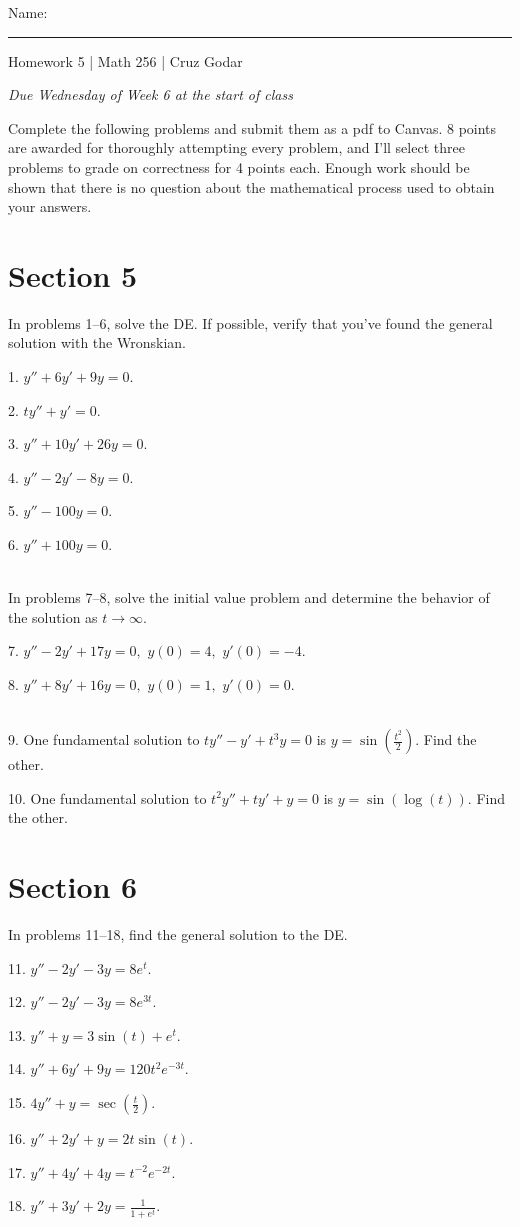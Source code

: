 \documentclass{article}
\begin{document}
\Large Name: \rule{2in}{0.15mm} \hfill Homework 5 | Math 256 | Cruz Godar \vspace{4pt}  \normalsize

\textit{Due Wednesday of Week 6 at the start of class}

Complete the following problems and submit them as a pdf to Canvas. 8 points are awarded for thoroughly attempting every problem, and I'll select three problems to grade on correctness for 4 points each. Enough work should be shown that there is no question about the mathematical process used to obtain your answers.

\section{Section 5}

In problems 1--6, solve the DE. If possible, verify that you've found the general solution with the Wronskian.

1. $\displaystyle y'' + 6y' + 9y = 0.$

2. $\displaystyle ty'' + y' = 0.$

3. $\displaystyle y'' + 10y' + 26y = 0.$

4. $\displaystyle y'' - 2y' - 8y = 0.$

5. $\displaystyle y'' - 100y = 0.$

6. $\displaystyle y'' + 100y = 0.$

~\\

In problems 7--8, solve the initial value problem and determine the behavior of the solution as $t \to \infty$.

7. $\displaystyle y'' - 2y' + 17y = 0,$ $\displaystyle y(0) = 4,$ $\displaystyle y'(0) = -4.$

8. $\displaystyle y'' + 8y' + 16y = 0,$ $\displaystyle y(0) = 1,$ $\displaystyle y'(0) = 0.$

~\\

9. One fundamental solution to $\displaystyle ty'' - y' + t^3y = 0$ is $y = \sin\left(\frac{t^2}{2}\right)$. Find the other.

10. One fundamental solution to $\displaystyle t^2y'' + ty' + y = 0$ is $y = \sin(\log(t))$. Find the other.

\section{Section 6}

In problems 11--18, find the general solution to the DE.

11. $\displaystyle y'' - 2y' - 3y = 8e^t.$

12. $\displaystyle y'' - 2y' - 3y = 8e^{3t}.$

13. $\displaystyle y'' + y = 3\sin(t) + e^t.$

14. $\displaystyle y'' + 6y' + 9y = 120t^2e^{-3t}.$

15. $\displaystyle 4y'' + y = \sec\left(\frac{t}{2}\right).$

16. $\displaystyle y'' + 2y' + y = 2t\sin(t).$

17. $\displaystyle y'' + 4y' + 4y = t^{-2} e^{-2t}.$

18. $\displaystyle y'' + 3y' + 2y = \frac{1}{1 + e^t}.$
\end{document}
